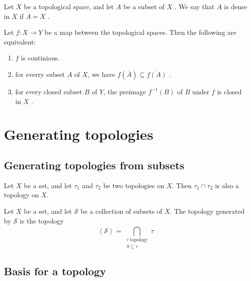 \documentclass{article}
\theoremstyle{remark}
\begin{document}
\begin{definition}[Dense]
    Let $X$ be a topological space, and let $A$ be a subset of $X$ . We say that $A$ is dense in $X$ if $\overline{A}  =
    X$ .
\end{definition}

\begin{theorem}
    Let $f: X \to Y$  be a map between the topological spaces. Then the following are equivalent:
   \begin{enumerate}[label=(\roman*)]
       \item $f$  is continious.
       \item for everry subset $A$  of $X$, we have $f\left( \overline{A}  \right) \subseteq \overline{f\left( A
           \right)} $ .
       \item for every closed subset $B$ of $Y$, the preimage $f^{-1}\left( B \right)$ of $B$ under $f$  is closed in
           $X$ .
   \end{enumerate}
\end{theorem}

\section{ Generating topologies}%
\label{sec:chapter_4_generating_topologies}

\subsection{Generating topologies from subsets}%
\label{sub:generating_topologies_from_subsets}



\begin{theorem}
    Let $X$ be a set, and let $\tau _{1}$ and $\tau _{2}$ be two topologies on $X$. Then $\tau _{1} \cap \tau _{2}$ is
    also a topology on $X$.
\end{theorem}

\begin{definition}
    Let $X$ be a set, and let $ \mathscr{S} $ be a collection of subsets of $X$. The topology generated by
    $\mathscr{S}$ is the topology \[
    \left<\mathscr{S}  \right> = \bigcap_{\substack{\tau  \text{ topology} \\ S \subseteq \tau  } }^{}  \tau
    \]
\end{definition}

\subsection{Basis for a topology}%
\label{sub:basis_for_a_topology}
\end{document}
